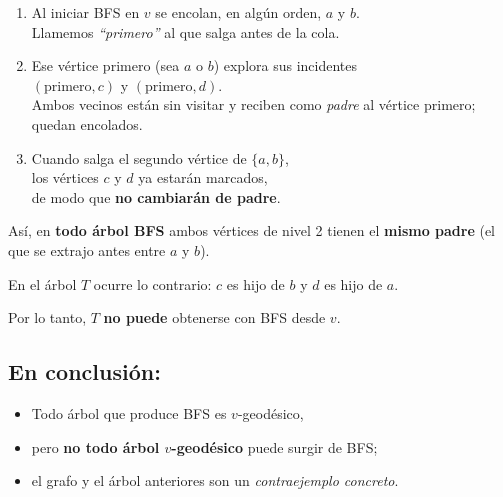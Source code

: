 \documentclass{article}
\begin{document}
\begin{enumerate}
  \item Al iniciar BFS en \(v\) se encolan, en algún orden, \(a\) y \(b\).\\
        Llamemos \emph{“primero”} al que salga antes de la cola.

  \item Ese vértice primero (sea \(a\) o \(b\)) explora sus incidentes\\
        \((\text{primero}, c)\) y \((\text{primero}, d)\).\\
        Ambos vecinos están sin visitar y reciben como \emph{padre} al vértice primero; quedan encolados.

  \item Cuando salga el segundo vértice de \(\{a, b\}\),\\
        los vértices \(c\) y \(d\) ya estarán marcados,\\
        de modo que \textbf{no cambiarán de padre}.
\end{enumerate}

Así, en \textbf{todo árbol BFS} ambos vértices de nivel 2  
tienen el \textbf{mismo padre} (el que se extrajo antes entre \(a\) y \(b\)).

En el árbol \(T\) ocurre lo contrario:  
\(c\) es hijo de \(b\) y \(d\) es hijo de \(a\).  

Por lo tanto, \(T\) \textbf{no puede} obtenerse con BFS desde \(v\).

\vspace{1em}

\subsection*{En conclusión:}

\begin{itemize}
  \item Todo árbol que produce BFS es \(v\)-geodésico,

  \item pero \textbf{no todo árbol \(v\)-geodésico} puede surgir de BFS;

  \item el grafo y el árbol anteriores son un \emph{contraejemplo concreto}.
\end{itemize}
\end{document}
